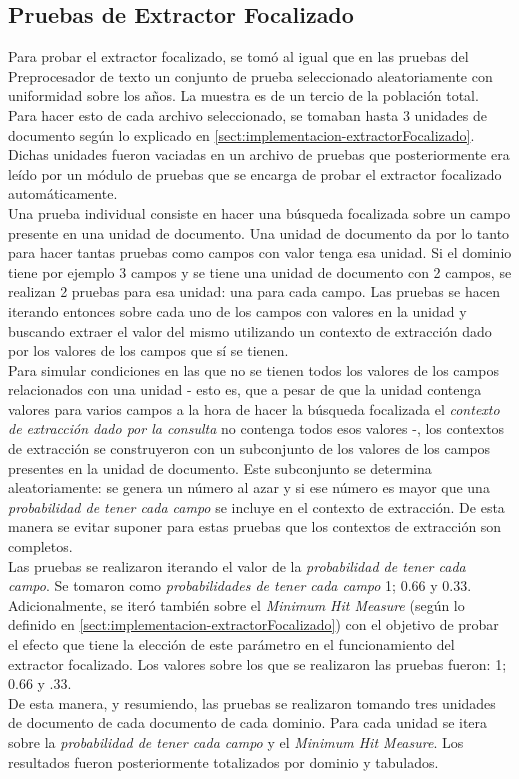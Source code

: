 \subsection{Pruebas de Extractor Focalizado}

Para probar el extractor focalizado, se tomó al igual que en las pruebas del Preprocesador de texto un conjunto de prueba seleccionado aleatoriamente con uniformidad sobre los años. La muestra es de un tercio de la población total. Para hacer esto de cada archivo seleccionado, se tomaban hasta 3 unidades de documento según lo explicado en \ref{sect:implementacion-extractorFocalizado}. Dichas unidades fueron vaciadas en un archivo de pruebas que posteriormente era leído por un módulo de pruebas que se encarga de probar el extractor focalizado automáticamente. \\

Una prueba individual consiste en hacer una búsqueda focalizada sobre un campo presente en una unidad de documento. Una unidad de documento da por lo tanto para hacer tantas pruebas como campos con valor tenga esa unidad. Si el dominio tiene por ejemplo 3 campos y se tiene una unidad de documento con 2 campos, se realizan 2 pruebas para esa unidad: una para cada campo. Las pruebas se hacen iterando entonces sobre cada uno de los campos con valores en la unidad y buscando extraer el valor del mismo utilizando un contexto de extracción dado por los valores de los campos que sí se tienen. \\ 

Para simular condiciones en las que no se tienen todos los valores de los campos relacionados con una unidad - esto es, que a pesar de que la unidad contenga valores para varios campos a la hora de hacer la búsqueda focalizada el \emph{contexto de extracción dado por la consulta} no contenga todos esos valores -, los contextos de extracción se construyeron con un subconjunto de los valores de los campos presentes en la unidad de documento. Este subconjunto se determina aleatoriamente: se genera un número al azar y si ese número es mayor que una \emph{probabilidad de tener cada campo} se incluye en el contexto de extracción. De esta manera se evitar suponer para estas pruebas que los contextos de extracción son completos.\\

Las pruebas se realizaron iterando el valor de la \emph{probabilidad de tener cada campo}. Se tomaron como \emph{probabilidades de tener cada campo} 1; 0.66 y 0.33. Adicionalmente, se iteró también sobre el \emph{Minimum Hit Measure} (según lo definido en \ref{sect:implementacion-extractorFocalizado}) con el objetivo de probar el efecto que tiene la elección de este parámetro en el funcionamiento del extractor focalizado. Los valores sobre los que se realizaron las pruebas fueron: 1; 0.66 y .33.\\

De esta manera, y resumiendo, las pruebas se realizaron tomando tres unidades de documento de cada documento de cada dominio. Para cada unidad se itera sobre la \emph{probabilidad de tener cada campo} y el \emph{Minimum Hit Measure}. Los resultados fueron posteriormente totalizados por dominio y tabulados. \\

